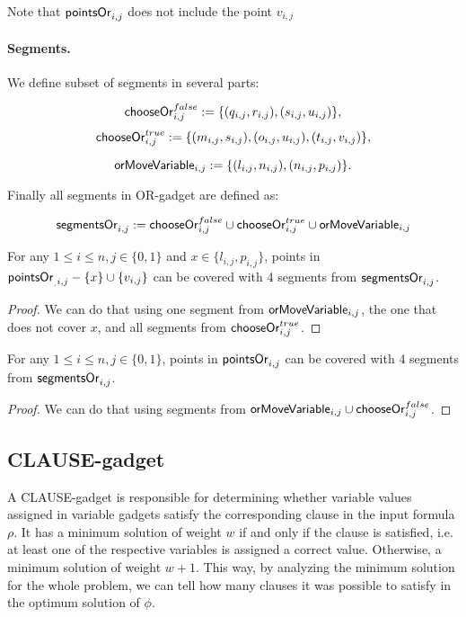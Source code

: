 Note that $\mathsf{pointsOr}_{i,j}$ does not include the point $v_{i,j}$
 
\paragraph{Segments.}

We define subset of segments in several parts:
 
$$\mathsf{chooseOr}^{false}_{i,j} :=
\{ (q_{i, j}, r_{i, j}), (s_{i, j}, u_{i, j})\},$$
$$\mathsf{chooseOr}^{true}_{i,j} :=
\{ (m_{i, j}, s_{i, j}), (o_{i, j}, u_{i, j}),
(t_{i, j}, v_{i, j}) \},$$

$$\mathsf{orMoveVariable}_{i,j} :=
\{ (l_{i, j}, n_{i, j}), (n_{i, j}, p_{i, j})\}.$$

Finally all segments in OR-gadget are defined as:

$$\mathsf{segmentsOr}_{i,j} := 
  \mathsf{chooseOr}^{false}_{i,j} \cup \mathsf{chooseOr}^{true}_{i,j} \cup \mathsf{orMoveVariable}_{i,j}
$$


\begin{lemma}
\label{cover_or_true}
For any $1 \le i \le n, j \in \{0, 1\}$ and 
 $x \in \{l_{i, j}, p_{i, j}\}$, points in
$\mathsf{pointsOr}_{_,i, j} - \{ x\} \cup \{v_{i, j}\}$
can be covered
with 4 segments from $\mathsf{segmentsOr}_{i,j}$.
\end{lemma}

\begin{proof}
We can do that using one segment from
$\mathsf{orMoveVariable}_{i,j}$, the one that does not cover $x$,
and all segments from $\mathsf{chooseOr}^{true}_{i,j}$.
\end{proof}

\begin{lemma}
\label{cover_or_false}
For any $1 \le i \le n, j \in \{0, 1\}$, points in
$\mathsf{pointsOr}_{i,j}$ can be covered
with 4 segments from $\mathsf{segmentsOr}_{i,j}$.
\end{lemma}

\begin{proof}
We can do that using segments from $\mathsf{orMoveVariable}_{i,j} \cup \mathsf{chooseOr}^{false}_{i,j}$.
\end{proof}


\subsection{CLAUSE-gadget}
A CLAUSE-gadget is responsible for determining whether
variable values assigned in variable gadgets
satisfy the corresponding clause in the input formula $\rho$.
It has a minimum solution of weight $w$
if and only if the clause is satisfied, i.e. at least one
of the respective variables is assigned a correct value.
Otherwise, a minimum solution of weight $w+1$.
This way, by analyzing the minimum solution for the whole problem,
we can tell how many clauses it was possible to satisfy
in the optimum solution of $\phi$.

